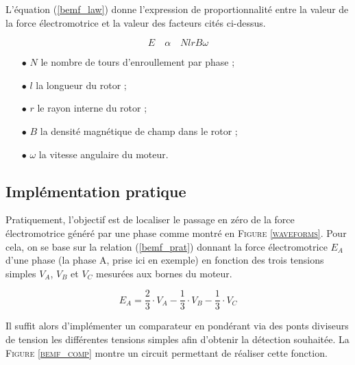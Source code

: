 		L'équation (\ref{bemf_law}) donne l'expression de proportionnalité
		entre la valeur de la force électromotrice et la valeur des 
		facteurs cités ci-dessus.
		
		\begin{equation}
			E\quad\alpha\quad
			NlrB\omega
			\label{bemf_law}
		\end{equation}
		
		\begin{itemize}
			\item[$\bullet$] $N$ le nombre de tours d'enroullement par phase ;
			\item[$\bullet$] $l$ la longueur du rotor ;
			\item[$\bullet$] $r$ le rayon interne du rotor ;
			\item[$\bullet$] $B$ la densité magnétique de champ dans le rotor ;
 			\item[$\bullet$] $\omega$ la vitesse angulaire du moteur.
		\end{itemize}
		
		\vspace{-1em}
		
		\subsection{Implémentation pratique}
		
		Pratiquement, l'objectif est de localiser le passage en zéro de
		la force électromotrice généré par une phase comme montré
		en \textsc{Figure \ref{waveforms}}. Pour cela, on se base sur
		la relation (\ref{bemf_prat}) donnant la force électromotrice $E_A$ d'une 
		phase (la phase A, prise ici en exemple) en fonction des trois 
		tensions simples $V_A$, $V_B$ et $V_C$ mesurées aux bornes du moteur.
		
		\begin{equation}
		E_A =\frac{2}{3}\cdot V_A - \frac{1}{3}\cdot V_B - \frac{1}{3}\cdot V_C
 		\label{bemf_prat}
		\end{equation}
		
		Il suffit alors d'implémenter un comparateur en pondérant via
		des ponts diviseurs de tension les différentes tensions simples
		afin d'obtenir la détection souhaitée. La 
		\textsc{Figure \ref{bemf_comp}}
		montre un circuit permettant de réaliser cette fonction.
		
